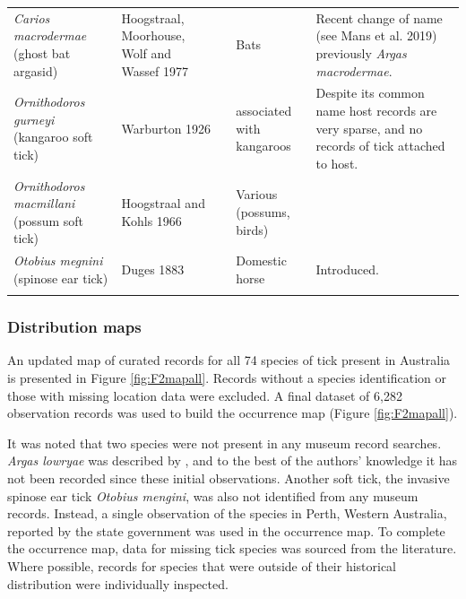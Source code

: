 \documentclass[a4paper, nobind]{templates/ociamthesis}
\begin{document}
\begin{landscape}
\begin{longtable}[t]{>{\raggedright\arraybackslash}p{4cm}>{\raggedright\arraybackslash}p{3cm}>{\raggedright\arraybackslash}p{1cm}>{\raggedright\arraybackslash}p{4cm}>{\raggedright\arraybackslash}p{6cm}}
\textit{Carios macrodermae} (ghost bat argasid) & Hoogstraal, Moorhouse, Wolf and Wassef 1977 & \multicolumn{1}{c}{\cellcolor[HTML]{BEBADA}{\textcolor{white}{N}}} & Bats & Recent change of name (see Mans et al. 2019) previously \textit{Argas macrodermae}.\\
\textit{Ornithodoros gurneyi} (kangaroo soft tick) & Warburton 1926 & \multicolumn{1}{c}{\cellcolor[HTML]{8DD3C7}{\textcolor{white}{Y}}} & associated with kangaroos & Despite its common name host records are very sparse, and no records of tick attached to host.\\
\textit{Ornithodoros macmillani} (possum soft tick) & Hoogstraal and Kohls 1966 & \multicolumn{1}{c}{\cellcolor[HTML]{BEBADA}{\textcolor{white}{N}}} & Various (possums, birds) & \\
\textit{Otobius megnini} (spinose ear tick) & Duges 1883 & \multicolumn{1}{c}{\cellcolor[HTML]{BEBADA}{\textcolor{white}{N}}} & Domestic horse & Introduced.\\*
\end{longtable}
\endgroup{}
\end{landscape}

\newpage

\hypertarget{distribution-maps}{%
\subsubsection{Distribution maps}\label{distribution-maps}}

An updated map of curated records for all 74 species of tick present in Australia is presented in Figure \ref{fig:F2mapall}.
Records without a species identification or those with missing location data were excluded.
A final dataset of 6,282 observation records was used to build the occurrence map (Figure \ref{fig:F2mapall}).

It was noted that two species were not present in any museum record searches.
\emph{Argas lowryae} was described by \textcite{kaiserObservationsSubgenusArgas1975}, and to the best of the authors' knowledge it has not been recorded since these initial observations.
Another soft tick, the invasive spinose ear tick \emph{Otobius mengini}, was also not identified from any museum records.
Instead, a single observation of the species in Perth, Western Australia, reported by the state government \autocite{mayberrySpinoseEarTick2003} was used in the occurrence map.
To complete the occurrence map, data for missing tick species was sourced from the literature.
Where possible, records for species that were outside of their historical distribution were individually inspected.
\end{document}
